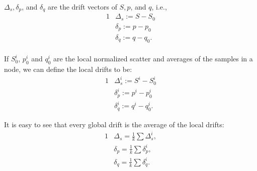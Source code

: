 $\Delta_s, \delta_p$, and $\delta_q$ are the drift vectors of $S, p$, and $q$,
i.e.,
\begin{alignat*}{1}
& \Delta_s:= S - S_0 \\
& \delta_p:= p - p_0 \\
& \delta_q := q - q_0.
\end{alignat*}
\\If $S_0^i$, $p_0^i$ and $q_0^i$ are the local normalized scatter and averages
of the samples in a node, we can define the local drifts to be:
\begin{alignat*}{1}
& \Delta_s^i:= S^i - S_0^i
\\ & \delta_p^i:= p^i - p_0^i
\\ & \delta_q^i:= q^i - q_0^i.
\end{alignat*}
\begin{remark} \label{average}
It is easy to see that every global drift is the average of the local drifts:
\begin{alignat*}{1}
& \Delta_s = \frac{1}{k} \sum \Delta_s^i, \\
& \delta_p = \frac{1}{k} \sum \delta_p^i, \\
& \delta_q = \frac{1}{k} \sum \delta_q^i.
\end{alignat*}

\end{remark}

